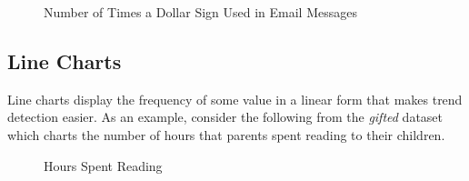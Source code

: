 \begin{figure}[H]
  \begin{center}
    \caption{Number of Times a Dollar Sign Used in Email Messages}
    \label{vfr:img08}
  \end{center}
\end{figure}

\subsection{Line Charts}

Line charts display the frequency of some value in a linear form that makes trend detection easier. As an example, consider the following from the \textit{gifted} dataset which charts the number of hours that parents spent reading to their children.

\begin{figure}[H]
  \begin{center}
    \caption{Hours Spent Reading}
    \label{vfr:img08a}
  \end{center}
\end{figure}

